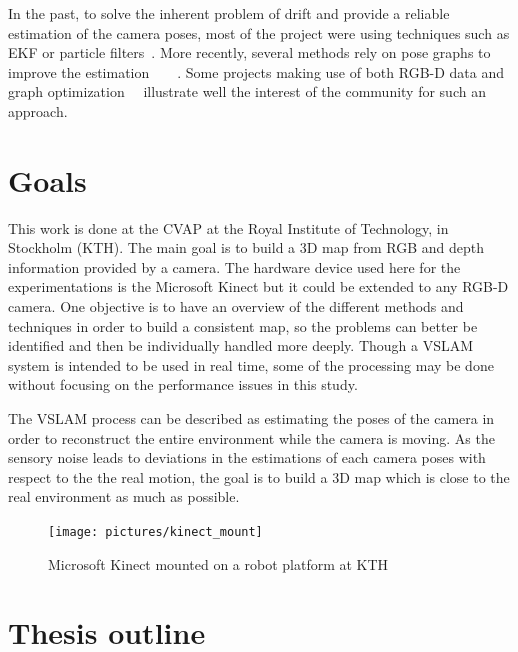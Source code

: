 In the past, to solve the inherent problem of drift and provide a reliable estimation of the camera poses, most of the project were using techniques such as \gls{EKF} or particle filters~\cite{Thrun_2005}. More recently, several methods rely on pose graphs to improve the estimation~\cite{Thrun05_GraphSLAM}~\cite{grisetti07rss}~\cite{g2o_2011}~\cite{hogman_2010}. Some projects making use of both RGB-D data and graph optimization~\cite{Henry_RGBD_2010}~\cite{engelhard11euron-workshop} illustrate well the interest of the community for such an approach.

\clearpage
\section{Goals}

This work is done at the \gls{CVAP} at the Royal Institute of Technology, in Stockholm (KTH). The main goal is to build a 3D map from RGB and depth information provided by a camera. The hardware device used here for the experimentations is the Microsoft Kinect but it could be extended to any RGB-D camera. One objective is to have an overview of the different methods and techniques in order to build a consistent map, so the problems can better be identified and then be individually handled more deeply. Though a \gls{VSLAM} system is intended to be used in real time, some of the processing may be done without focusing on the performance issues in this study. 

The \gls{VSLAM} process can be described as estimating the poses of the camera in order to reconstruct the entire environment while the camera is moving. As the sensory noise leads to deviations in the estimations of each camera poses with respect to the the real motion, the goal is to build a 3D map which is close to the real environment as much as possible.

\begin{figure}[H]
\centering
\texttt{[image: pictures/kinect\_mount]}
\caption{Microsoft Kinect mounted on a robot platform at KTH}
\end{figure}

\clearpage
\section{Thesis outline}

